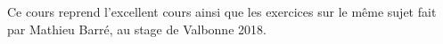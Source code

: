 Ce cours reprend l'excellent cours ainsi que les exercices sur le même sujet fait par Mathieu Barré, au stage de Valbonne 2018.